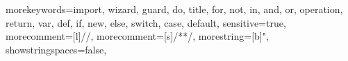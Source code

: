 {morekeywords={import, wizard, guard, do, title, for, not, in, and, or, operation, return, var, def, if, new, else, switch, case, default},
sensitive=true,
morecomment=[l]{//},
morecomment=[s]{/*}{*/},
morestring=[b]",
showstringspaces=false,
}
